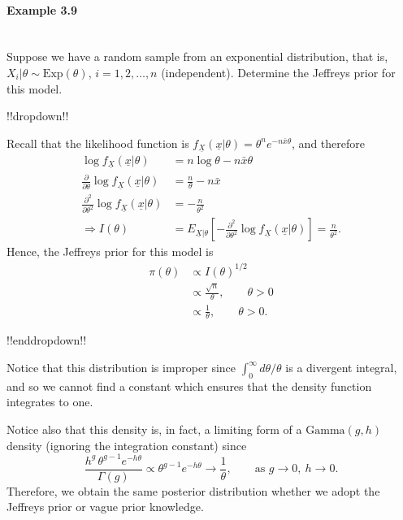 \paragraph{Example 3.9}{~\\
Suppose we have a random sample from an exponential distribution, that \label{ex:38} is, $X_i|\theta\sim \mathrm{Exp}(\theta)$, $i=1,2,\ldots,n$ (independent). Determine the Jeffreys prior for this model.

!!dropdown!!

Recall that the likelihood function is
    $f_{\underline{X}}(\underline{x}|\theta)=\theta^n e^{-n\bar x\theta}$,
    and therefore 
    \begin{align*}
    \log f_{\underline{X}}(\underline{x}|\theta) &=n\log\theta -n\bar x\theta \\
    \frac{\partial}{\partial\theta} \log
    f_{\underline{X}}(\underline{x}|\theta) &=\frac{n}{\theta}-n\bar x \\
    \frac{\partial^2}{\partial\theta^2} \log
    f_{\underline{X}}(\underline{x}|\theta)&=-\frac{n}{\theta^2} \\ 
    \Rightarrow I(\theta) &=E_{\underline{X}|\theta}
    \left[-\frac{\partial^2}{\partial\theta^2} \log
    f_{\underline{X}}(\underline{x}|\theta)\right]=\frac{n}{\theta^2}.
    \end{align*}
    Hence, the Jeffreys prior for this model is
    \begin{align*}
    \pi(\theta)&\propto I(\theta)^{1/2} \\
    &\propto \frac{\sqrt{n}}{\theta},\quad\quad\theta>0 \\
    &\propto \frac{1}{\theta},\quad\quad\theta>0.
    \end{align*}

!!enddropdown!!

Notice that this distribution is improper since $\int_0^\infty d\theta/\theta$ is a divergent integral, and so we cannot find a constant which ensures that the density function integrates to one.

Notice also that this density is, in fact, a limiting form of a $\mathrm{Gamma}(g,h)$ density (ignoring the integration constant) since
\begin{equation*}
\frac{h^g\,\theta^{g-1}e^{-h\theta}}{\Gamma(g)}\propto
\theta^{g-1}e^{-h\theta} 
\to \frac{1}{\theta},\quad\quad\text{as }g\to 0,~h\to 0.
\end{equation*}
Therefore, we obtain the same posterior distribution whether we adopt the Jeffreys prior or vague prior knowledge.}

